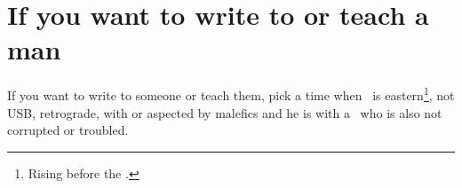 \section{If you want to write to or teach a man}
If you want to write to someone or teach them, pick a time when \Mercury\, is eastern\footnote{Rising before the \Sun.}, not USB, retrograde, with or aspected by malefics and he is with a \Moon\, who is also not corrupted or troubled.